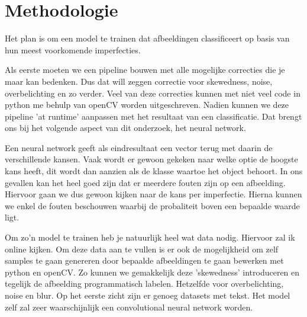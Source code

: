 
%

\section{Methodologie}
\label{sec:methodologie}
Het plan is om een model te trainen dat afbeeldingen classificeert op basis van hun meest voorkomende imperfecties.

Als eerste moeten we een pipeline bouwen met alle mogelijke correcties die je maar kan bedenken. Dus dat will zeggen correctie voor skewedness, noise, overbelichting en zo verder. Veel van deze correcties kunnen met niet veel code in python me behulp van openCV worden uitgeschreven. Nadien kunnen we deze pipeline 'at runtime' aanpassen met het resultaat van een classificatie. Dat brengt ons bij het volgende aspect van dit onderzoek, het neural network.

Een neural network geeft als eindresultaat een vector terug met daarin de verschillende kansen. Vaak wordt er gewoon gekeken naar welke optie de hoogste kans heeft, dit wordt dan aanzien als de klasse waartoe het object behoort. In ons gevallen kan het heel goed zijn dat er meerdere fouten zijn op een afbeelding. Hiervoor gaan we dus gewoon kijken naar de kans per imperfectie. Hierna kunnen we enkel de fouten beschouwen waarbij de probaliteit boven een bepaalde waarde ligt.

Om zo’n model te trainen heb je natuurlijk heel wat data nodig. Hiervoor zal ik online kijken. Om deze data aan te vullen is er ook de mogelijkheid om zelf samples te gaan genereren door bepaalde afbeeldingen te gaan bewerken met python en openCV. Zo kunnen we gemakkelijk deze 'skewedness' introduceren en tegelijk de afbeelding programmatisch labelen. Hetzelfde voor overbelichting, noise en blur. Op het eerste zicht zijn er genoeg datasets met tekst.
Het model zelf zal zeer waarschijnlijk een convolutional neural network worden. 

